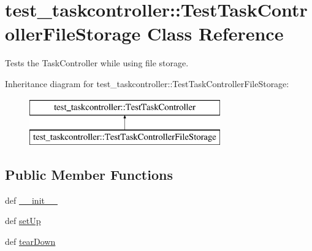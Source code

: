 \hypertarget{classtest__taskcontroller_1_1TestTaskControllerFileStorage}{
\section{test\-\_\-taskcontroller\-:\-:\-Test\-Task\-Controller\-File\-Storage \-Class \-Reference}
\label{classtest__taskcontroller_1_1TestTaskControllerFileStorage}
}


\-Tests the \-Task\-Controller while using file storage.  


\-Inheritance diagram for test\-\_\-taskcontroller\-:\-:\-Test\-Task\-Controller\-File\-Storage\-:\begin{figure}[H]
\begin{center}
\leavevmode
\includegraphics[height=2.000000cm]{classtest__taskcontroller_1_1TestTaskControllerFileStorage}
\end{center}
\end{figure}
\subsection*{\-Public \-Member \-Functions}
\begin{DoxyCompactItemize}
\item 
def \hyperlink{classtest__taskcontroller_1_1TestTaskControllerFileStorage_a1f63de1b9c566d073b4a11c5a49530c6}{\-\_\-\-\_\-init\-\_\-\-\_\-}
\item 
def \hyperlink{classtest__taskcontroller_1_1TestTaskControllerFileStorage_a6365fcf7e86a92beb75a3ba9295757e9}{set\-Up}
\item 
def \hyperlink{classtest__taskcontroller_1_1TestTaskControllerFileStorage_aaa88d65a1ecdd339726cc2fd67334743}{tear\-Down}
\end{DoxyCompactItemize}
